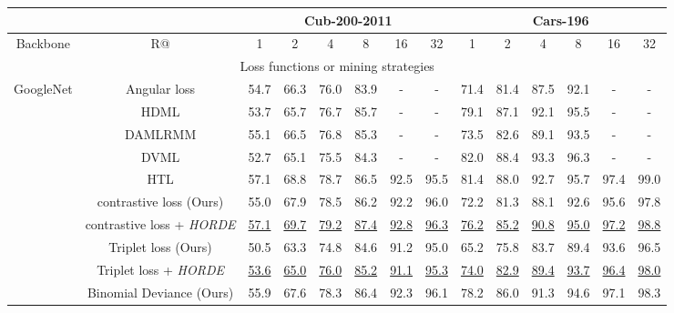 \documentclass[10pt,twocolumn,letterpaper]{article}
\def\ourmethod{\textit{HORDE}}
\begin{document}
    \setlength{\tabcolsep}{6pt}
    \begin{table*}[t!]
        \footnotesize
        \begin{center}
            \begin{tabular}{|c|c|cccccc|cccccc|}\hline
                 & & \multicolumn{6}{c|}{Cub-200-2011} & \multicolumn{6}{c|}{Cars-196} \\\hline
                Backbone & R@ & 1 & 2 & 4 & 8 & 16 & 32 & 1 & 2 & 4 & 8 & 16 & 32 \\\hline\hline
                \multicolumn{14}{|c|}{Loss functions or mining strategies} \\\hline
\multirow{12}{*}{GoogleNet} & Angular loss \cite{Wang_2017_ICCV} & 54.7 & 66.3 & 76.0 & 83.9 & - & - & 71.4 & 81.4 & 87.5 & 92.1 & - & - \\
                 & HDML \cite{Zheng_2019_CVPR} & 53.7 & 65.7 & 76.7 & 85.7 & - & - & 79.1 & 87.1 & 92.1 & 95.5 & - & - \\
                 & DAMLRMM \cite{Xu_2019_CVPR} & 55.1 & 66.5 & 76.8 & 85.3 & - & - & 73.5 & 82.6 & 89.1 & 93.5 & - & - \\
                 & DVML \cite{Lin_2018_ECCV} & 52.7 & 65.1 & 75.5 & 84.3 & - & - & 82.0 & 88.4 & 93.3 & 96.3 & - & - \\
                 & HTL \cite{Ge_2018_ECCV} & 57.1 & 68.8 & 78.7 & 86.5 & 92.5 & 95.5 & 81.4 & 88.0 & 92.7 & 95.7 & 97.4 & 99.0 \\
                \cline{2-14}
& contrastive loss (Ours) & 55.0 & 67.9 & 78.5 & 86.2 & 92.2 & 96.0 & 72.2 & 81.3 & 88.1 & 92.6 & 95.6 & 97.8 \\
                 & contrastive loss + \ourmethod & \underline{57.1} & \underline{69.7} & \underline{79.2} & \underline{87.4} & \underline{92.8} & \underline{96.3} & \underline{76.2} & \underline{85.2} & \underline{90.8} & \underline{95.0} & \underline{97.2} & \underline{98.8} \\
& Triplet loss (Ours) & 50.5 & 63.3 & 74.8 & 84.6 & 91.2 & 95.0 & 65.2 & 75.8 & 83.7 & 89.4 & 93.6 & 96.5 \\
                 & Triplet loss + \ourmethod & \underline{53.6} & \underline{65.0} & \underline{76.0} & \underline{85.2} & \underline{91.1} & \underline{95.3} & \underline{74.0} & \underline{82.9} & \underline{89.4} & \underline{93.7} & \underline{96.4} & \underline{98.0} \\
& Binomial Deviance (Ours) & 55.9 & 67.6 & 78.3 & 86.4 & 92.3 & 96.1 & 78.2 & 86.0 & 91.3 & 94.6 & 97.1 & 98.3 \\

\end{tabular}
\end{center}
\end{table*}
\end{document}

